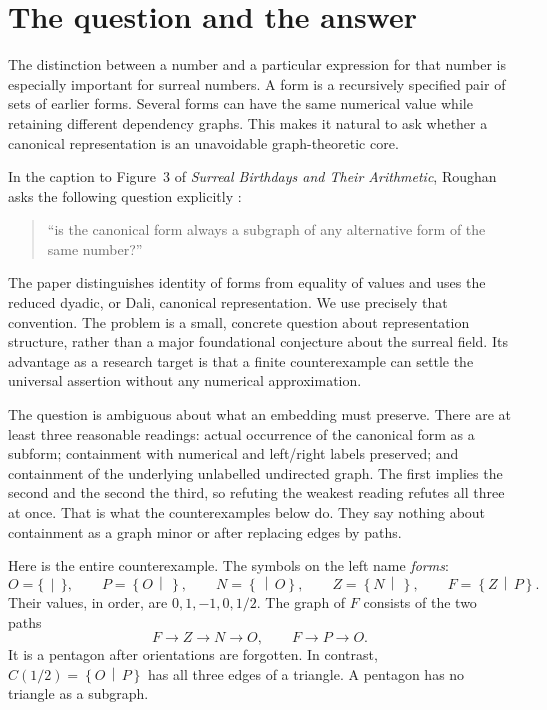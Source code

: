 \documentclass[11pt,a4paper]{article}
\numberwithin{equation}{section}
\theoremstyle{definition}
\theoremstyle{remark}
\newcommand{\cut}[2]{\left\{#1\,\middle|\,#2\right\}}
\newcommand{\emptycut}{\{\,\mid\,\}}
\newcommand{\can}{C}
\begin{document}
\clearpage
\tableofcontents
\clearpage

\section{The question and the answer}
\label{sec:intro}

The distinction between a number and a particular expression for that number
is especially important for surreal numbers. A form is a recursively specified
pair of sets of earlier forms. Several forms can have the same numerical value
while retaining different dependency graphs. This makes it natural to ask
whether a canonical representation is an unavoidable graph-theoretic core.

In the caption to Figure~3 of \emph{Surreal Birthdays and Their Arithmetic},
Roughan asks the following question explicitly \cite[p.~7]{Roughan2018}:
\begin{quote}
``is the canonical form always a subgraph of any alternative form of the same number?''
\end{quote}
The paper distinguishes identity of forms from equality of values and uses the
reduced dyadic, or Dali, canonical representation. We use precisely that
convention. The problem is a small, concrete question about representation
structure, rather than a major foundational conjecture about the surreal field.
Its advantage as a research target is that a finite counterexample can settle
the universal assertion without any numerical approximation.

The question is ambiguous about what an embedding must preserve. There are at
least three reasonable readings: actual occurrence of the canonical form as a
subform; containment with numerical and left/right labels preserved; and
containment of the underlying unlabelled undirected graph. The first implies the
second and the second the third, so refuting the weakest reading refutes all
three at once. That is what the counterexamples below do. They say nothing about
containment as a graph minor or after replacing edges by paths.

Here is the entire counterexample. The symbols on the left name \emph{forms}:
\begin{equation}
\label{eq:main-five}
 O=\emptycut,\qquad
 P=\cut{O}{},\qquad
 N=\cut{}{O},\qquad
 Z=\cut{N}{},\qquad
 F=\cut{Z}{P}.
\end{equation}
Their values, in order, are $0,1,-1,0,1/2$. The graph of $F$ consists of the two
paths
\begin{equation}
\label{eq:main-paths}
 F\longrightarrow Z\longrightarrow N\longrightarrow O,
 \qquad
 F\longrightarrow P\longrightarrow O.
\end{equation}
It is a pentagon after orientations are forgotten. In contrast,
$\can(1/2)=\cut{O}{P}$ has all three edges of a triangle. A pentagon has no
triangle as a subgraph.
\end{document}
